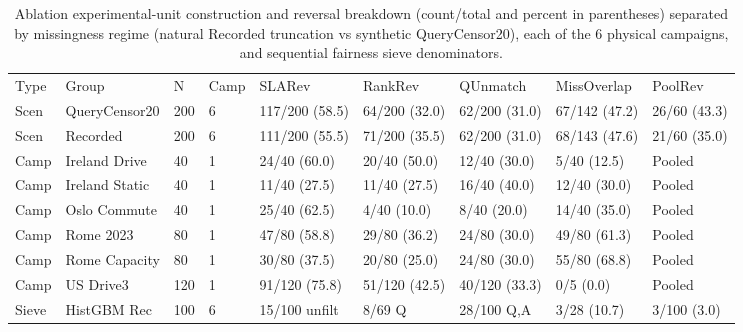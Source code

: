 \begin{table}[!ht]
\centering\footnotesize\setlength{\tabcolsep}{2.4pt}
\caption{Ablation experimental-unit construction and reversal breakdown (count/total and percent in parentheses) separated by missingness regime (natural Recorded truncation vs synthetic QueryCensor20), each of the 6 physical campaigns, and sequential fairness sieve denominators.}
\begin{tabular}{lllllllll}
\hline
Type & Group & N & Camp & SLARev & RankRev & QUnmatch & MissOverlap & PoolRev \\
Scen & QueryCensor20 & 200 & 6 & 117/200 (58.5) & 64/200 (32.0) & 62/200 (31.0) & 67/142 (47.2) & 26/60 (43.3) \\
Scen & Recorded & 200 & 6 & 111/200 (55.5) & 71/200 (35.5) & 62/200 (31.0) & 68/143 (47.6) & 21/60 (35.0) \\
Camp & Ireland Drive & 40 & 1 & 24/40 (60.0) & 20/40 (50.0) & 12/40 (30.0) & 5/40 (12.5) & Pooled \\
Camp & Ireland Static & 40 & 1 & 11/40 (27.5) & 11/40 (27.5) & 16/40 (40.0) & 12/40 (30.0) & Pooled \\
Camp & Oslo Commute & 40 & 1 & 25/40 (62.5) & 4/40 (10.0) & 8/40 (20.0) & 14/40 (35.0) & Pooled \\
Camp & Rome 2023 & 80 & 1 & 47/80 (58.8) & 29/80 (36.2) & 24/80 (30.0) & 49/80 (61.3) & Pooled \\
Camp & Rome Capacity & 80 & 1 & 30/80 (37.5) & 20/80 (25.0) & 24/80 (30.0) & 55/80 (68.8) & Pooled \\
Camp & US Drive3 & 120 & 1 & 91/120 (75.8) & 51/120 (42.5) & 40/120 (33.3) & 0/5 (0.0) & Pooled \\
Sieve & HistGBM Rec & 100 & 6 & 15/100 unfilt & 8/69 Q & 28/100 Q,A & 3/28 (10.7) & 3/100 (3.0) \\
\hline
\end{tabular}
\end{table}
